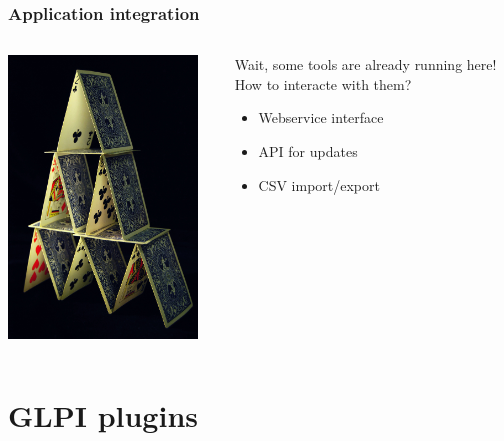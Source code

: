 \documentclass{beamer}
\begin{document}
\begin{frame}

    \frametitle{Application integration}
 \begin{columns}
 \begin{column}{0.45\textwidth}
         \includegraphics[height=7.5cm]{./pics/house_of_cards.jpg}
 \end{column}
 \begin{column}{0.45\textwidth}
     \begin{block}{Wait, some tools are already running here! \\
     How to interacte with them?}
        \begin{itemize}
            \item Webservice interface
            \item API for updates
            \item CSV import/export
        \end{itemize}
    \end{block}
   
 \end{column}
\end{columns}
\end{frame}



\section{GLPI plugins}
\end{document}
